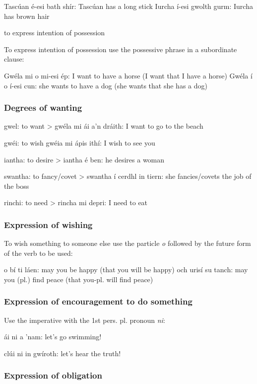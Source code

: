 Tasc\'{u}an \'{e}-esi bath sh\'{i}r: Tasc\'{u}an has a long stick
Iurcha \'{i}-esi gwolth gurm: Iurcha has brown hair

    to express intention of possession

To express intention of possession use the possessive phrase in a subordinate clause:

Gw\'{e}la mi o mi-esi \'{e}p: I want to have a horse (I want that I have a horse)
Gw\'{e}la \'{i} o \'{i}-esi cun: she wants to have a dog (she wants that she has a dog)

\subsubsection{Degrees of wanting}

gwel: to want
> gw\'{e}la mi \'{a}i a'n dr\'{a}ith: I want to go to the beach

gw\'{e}i: to wish
gw\'{e}ia mi \'{a}pis ith\'{i}: I wish to see you

iantha: to desire
> iantha \'{e} ben: he desires a woman

swantha: to fancy/covet
> swantha \'{i} cerdhl in tiern: she fancies/covets the job of the boss

rinchi: to need
> rincha mi depri: I need to eat

\subsubsection{Expression of wishing}

To wish something to someone else use the particle \textit{o} followed by the future form of the verb to be used:

o b\'{i} ti l\'{a}en: may you be happy (that you will be happy)
och uris\'{i} su tanch: may you (pl.) find peace (that you-pl. will find peace)
 
\subsubsection{Expression of encouragement to do something}

Use the imperative with the 1st pers. pl. pronoun \textit{ni}:
 
\'{a}i ni a 'nam: let's go swimming!

cl\'{u}i ni in gw\'{i}roth: let's hear the truth!

\subsubsection{Expression of obligation}

